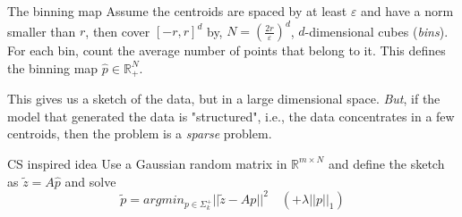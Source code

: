 \begin{frame}
	\begin{block}{The binning map}
		Assume the centroids are spaced by at least $\varepsilon$ and have a norm smaller than $r$, then cover $[-r,r]^d$ by, $N=(\frac{2r}{\varepsilon})^d$, $d$-dimensional cubes (\emph{bins}). For each bin, count the average number of points that belong to it. This defines the binning map $\hat{p}\in\mathbb{R}^N_+$.
	\end{block}
	This gives us a sketch of the data, but in a large dimensional space.\newline
	\emph{But}, if the model that generated the data is "structured", i.e., the data concentrates in a few centroids, then the problem is a \emph{sparse} problem.
	\begin{block}{CS inspired idea}
		Use a Gaussian random matrix in $\mathbb{R}^{m\times N}$ and define the sketch as $\tilde z = A\hat{p}$ and solve
		\begin{equation*}
			\tilde p = argmin_{p\in\Sigma_k^+}||\tilde z - Ap||^2\quad (+\lambda||p||_1)
		\end{equation*}

	\end{block}


\end{frame}

